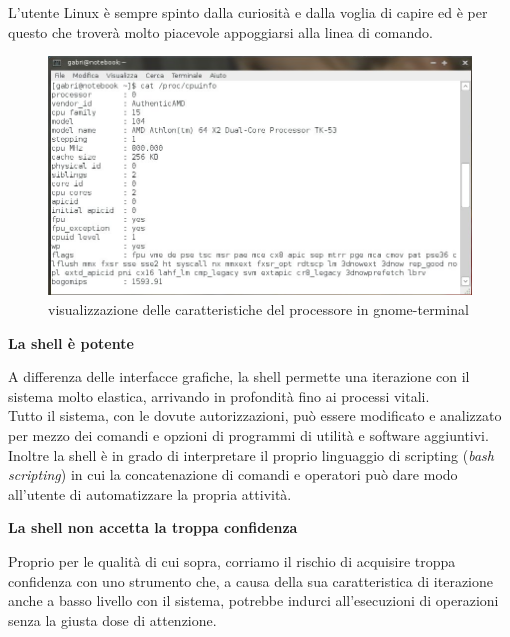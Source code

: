 L'utente Linux è sempre spinto dalla curiosità e dalla voglia di capire ed è per questo che troverà molto piacevole appoggiarsi alla linea di comando.\\


\begin{figure}[!htbp]
\centering
\includegraphics[scale=.60]{articoli/primi_passi/immagini/cpu_info.jpeg}
\caption{visualizzazione delle caratteristiche del processore in gnome-terminal\label{Fig.3: cpu_info}}
\end{figure}


\begin{center}
{\bfseries La shell è potente}
\end{center}

A differenza delle interfacce grafiche, la shell permette una iterazione con il sistema molto elastica, arrivando in profondità fino ai processi vitali.\\

Tutto il sistema, con le dovute autorizzazioni, può essere modificato e analizzato per mezzo dei comandi e opzioni di programmi di utilità e software aggiuntivi.\\

Inoltre la shell è in grado di interpretare il proprio linguaggio di scripting ({\itshape bash scripting}) in cui la concatenazione di comandi e operatori può dare modo all'utente di automatizzare la propria attività.\\

\begin{center}
{\bfseries La shell non accetta la troppa confidenza}
\end{center}
Proprio per le qualità di cui sopra, corriamo il rischio di acquisire troppa confidenza con uno strumento che, a causa della sua caratteristica di iterazione anche a basso livello con il sistema, potrebbe indurci all'esecuzioni di operazioni senza la giusta dose di attenzione.\\

